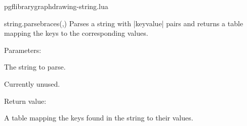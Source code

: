 
\begin{filedescription}{pgflibrarygraphdrawing-string.lua}


\begin{luacommand}{{string.parse\textunderscore{}braces}(,)}
Parses a string with |{key}{value}| pairs and returns a table mapping the keys to the corresponding values. 

Parameters:
\begin{parameterdescription}
	\item[\meta{str}] The string to parse.\item[\meta{default}] Currently unused. 
\end{parameterdescription}


Return value:
\begin{parameterdescription} 
  \item[] A table mapping the keys found in the string to their values. 
\end{parameterdescription}


\end{luacommand}

\end{filedescription}